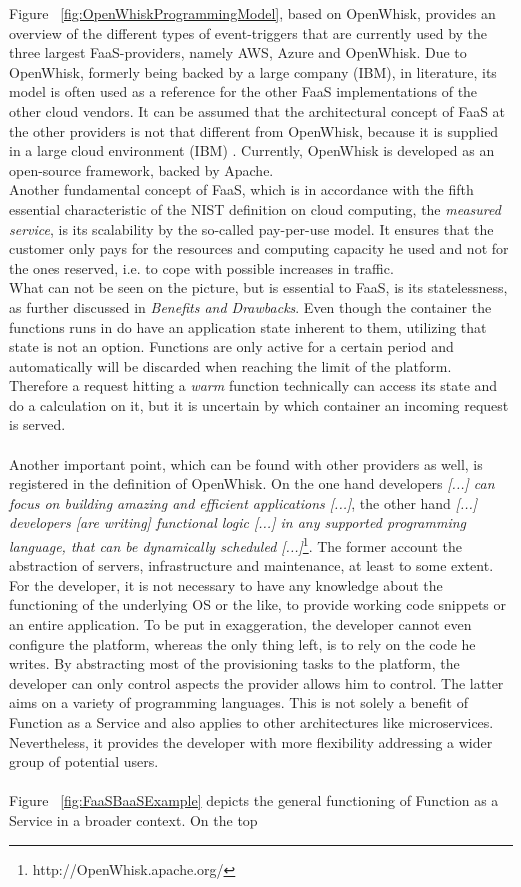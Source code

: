 \documentclass[a4paper,twoside,11pt, pagesize]{scrartcl}
\begin{document}
Figure ~\ref{fig:OpenWhiskProgrammingModel}, based on OpenWhisk, provides an overview of the different types of event-triggers that are currently used by the three largest FaaS-providers, namely AWS, Azure and OpenWhisk. Due to OpenWhisk, formerly being backed by a large company (IBM), in literature, its model is often used as a reference for the other FaaS implementations of the other cloud vendors. It can be assumed that the architectural concept of FaaS at the other providers is not that different from OpenWhisk, because it is supplied in a large cloud environment (IBM) \cite{van2019spec}. Currently, OpenWhisk is developed as an open-source framework, backed by Apache. \\ Another fundamental concept of FaaS, which is in accordance with the fifth essential characteristic of the NIST definition on cloud computing, the \textit{measured service}, is its scalability by the so-called pay-per-use model. It ensures that the customer only pays for the resources and computing capacity he used and not for the ones reserved, i.e. to cope with possible increases in traffic.\\ What can not be seen on the picture, but is essential to FaaS, is its statelessness, as further discussed in \textit{Benefits and Drawbacks}. Even though the container the functions runs in do have an application state inherent to them, utilizing that state is not an option. Functions are only active for a certain period and automatically will be discarded when reaching the limit of the platform. Therefore a request hitting a \textit{warm} function technically can access its state and do a calculation on it, but it is uncertain by which container an incoming request is served.\\\\ Another important point, which can be found with other providers as well, is registered in the definition of OpenWhisk. On the one hand developers \glqq \textit{[...] can focus on building amazing and efficient applications [...]}\grqq{}, the other hand \glqq \textit{[...] developers [are writing] functional logic [...] in any supported programming language, that can be dynamically scheduled [...]}\grqq{}\footnote{http://OpenWhisk.apache.org/}. The former account the abstraction of servers, infrastructure and maintenance, at least to some extent. For the developer, it is not necessary to have any knowledge about the functioning of the underlying OS or the like, to provide working code snippets or an entire application. To be put in exaggeration, the developer cannot even configure the platform, whereas the only thing left, is to rely on the code he writes. By abstracting most of the provisioning tasks to the platform, the developer can only control aspects the provider allows him to control. The latter aims on a variety of programming languages. This is not solely a benefit of Function as a Service and also applies to other architectures like microservices. Nevertheless, it provides the developer with more flexibility addressing a wider group of potential users.\\\\ Figure ~\ref{fig:FaaSBaaSExample} depicts the general functioning of Function as a Service in a broader context. On the top 
\end{document}
